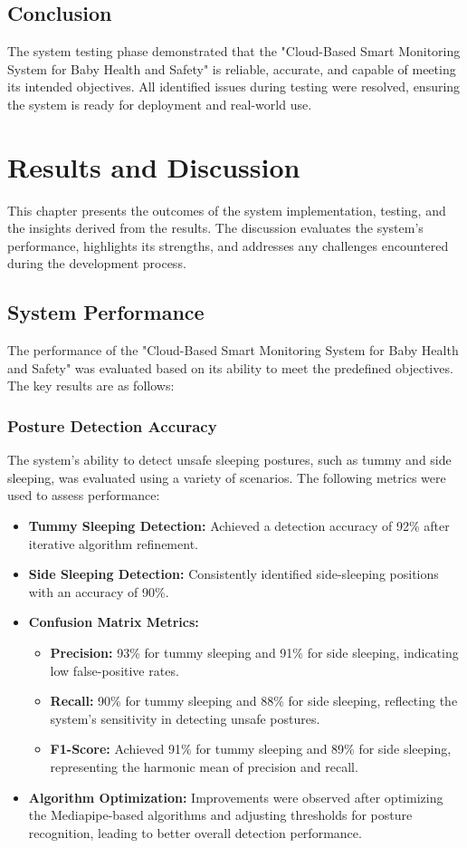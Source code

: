 \documentclass[12pt,a4paper]{report}
\begin{document}
\section{Conclusion}
The system testing phase demonstrated that the "Cloud-Based Smart Monitoring System for Baby Health and Safety" is reliable, accurate, and capable of meeting its intended objectives. All identified issues during testing were resolved, ensuring the system is ready for deployment and real-world use.


\chapter{Results and Discussion}

This chapter presents the outcomes of the system implementation, testing, and the insights derived from the results. The discussion evaluates the system's performance, highlights its strengths, and addresses any challenges encountered during the development process.

\section{System Performance}
The performance of the "Cloud-Based Smart Monitoring System for Baby Health and Safety" was evaluated based on its ability to meet the predefined objectives. The key results are as follows:

\subsection{Posture Detection Accuracy}
The system's ability to detect unsafe sleeping postures, such as tummy and side sleeping, was evaluated using a variety of scenarios. The following metrics were used to assess performance:

\begin{itemize}
    \item \textbf{Tummy Sleeping Detection:} Achieved a detection accuracy of 92\% after iterative algorithm refinement. 
    \item \textbf{Side Sleeping Detection:} Consistently identified side-sleeping positions with an accuracy of 90\%.
    \item \textbf{Confusion Matrix Metrics:} 
    \begin{itemize}
        \item \textbf{Precision:} 93\% for tummy sleeping and 91\% for side sleeping, indicating low false-positive rates.
        \item \textbf{Recall:} 90\% for tummy sleeping and 88\% for side sleeping, reflecting the system's sensitivity in detecting unsafe postures.
        \item \textbf{F1-Score:} Achieved 91\% for tummy sleeping and 89\% for side sleeping, representing the harmonic mean of precision and recall.
    \end{itemize}
    \item \textbf{Algorithm Optimization:} Improvements were observed after optimizing the Mediapipe-based algorithms and adjusting thresholds for posture recognition, leading to better overall detection performance.
\end{itemize}
\end{document}
